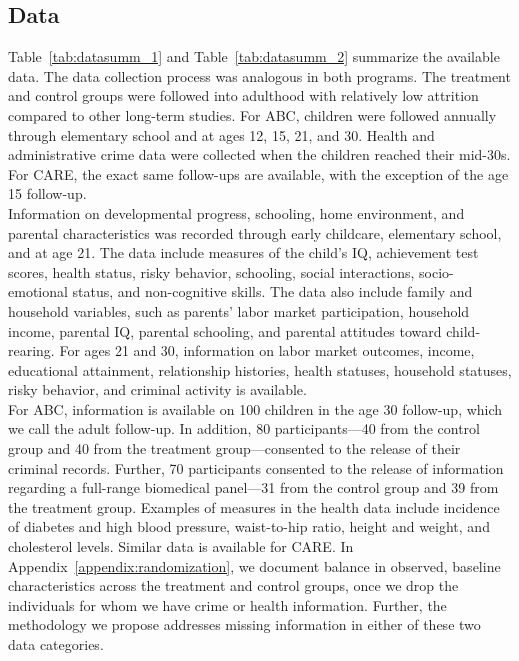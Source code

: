 \subsection{Data} \label{section:data}



\noindent Table~\ref{tab:datasumm_1} and Table~\ref{tab:datasumm_2} summarize the available data. The data collection process was analogous in both programs. The treatment and control groups were followed into adulthood with relatively low attrition compared to other long-term studies. For ABC, children were followed annually through elementary school and at ages 12, 15, 21, and 30. Health and administrative crime data were collected when the children reached their mid-30s. For CARE, the exact same follow-ups are available, with the exception of the age 15 follow-up.\\

\noindent Information on developmental progress, schooling, home environment, and parental characteristics was recorded through early childcare, elementary school, and at age 21. The data include measures of the child's IQ, achievement test scores, health status, risky behavior, schooling, social interactions, socio-emotional status, and non-cognitive skills. The data also include family and household variables, such as parents' labor market participation, household income, parental IQ, parental schooling, and parental attitudes toward child-rearing. For ages 21 and 30, information on labor market outcomes, income, educational attainment, relationship histories, health statuses, household statuses, risky behavior, and criminal activity is available.\\

\noindent For ABC, information is available on 100 children in the age 30 follow-up, which we call the adult follow-up. In addition, 80 participants---40 from the control group and 40 from the treatment group---consented to the release of their criminal records. Further, 70 participants consented to the release of information regarding a full-range biomedical panel---31 from the control group and 39 from the treatment group. Examples of measures in the health data include incidence of diabetes and high blood pressure, waist-to-hip ratio, height and weight, and cholesterol levels. Similar data is available for CARE. In Appendix~\ref{appendix:randomization}, we document balance in observed, baseline characteristics across the treatment and control groups, once we drop the individuals for whom we have crime or health information. Further, the methodology we propose addresses missing information in either of these two data categories.

